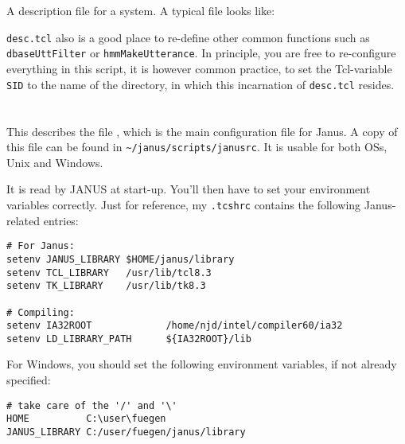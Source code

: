 


\section{}

A description file for a system. A typical file looks like:



{\tt  desc.tcl} also is   a good  place    to re-define other   common
functions such as {\tt  dbaseUttFilter} or {\tt hmmMakeUtterance}.  In
principle, you are free to re-configure everything  in this script, it
is however common  practice, to set  the Tcl-variable {\tt SID} to the
name  of  the directory, in which   this incarnation of {\tt desc.tcl}
resides.







\section{} \label{file:.janusrc}

This  describes the    file ,   which  is the    main
configuration file  for Janus.  A copy of  this file  can be  found in
\texttt{\~{ }/janus/scripts/janusrc}. It is  usable for both OSs, Unix
and Windows.



It is read by JANUS at start-up. You'll then have to set your environment
variables correctly. Just for reference, my \texttt{.tcshrc} contains
the following Janus-related entries:

{\small
\begin{verbatim}
# For Janus:
setenv JANUS_LIBRARY $HOME/janus/library
setenv TCL_LIBRARY   /usr/lib/tcl8.3
setenv TK_LIBRARY    /usr/lib/tk8.3

# Compiling:
setenv IA32ROOT             /home/njd/intel/compiler60/ia32
setenv LD_LIBRARY_PATH      ${IA32ROOT}/lib

\end{verbatim}
}

For Windows, you should set the following environment variables, if
not already specified:

{\small
\begin{verbatim}
# take care of the '/' and '\'
HOME          C:\user\fuegen
JANUS_LIBRARY C:/user/fuegen/janus/library
\end{verbatim}
}

